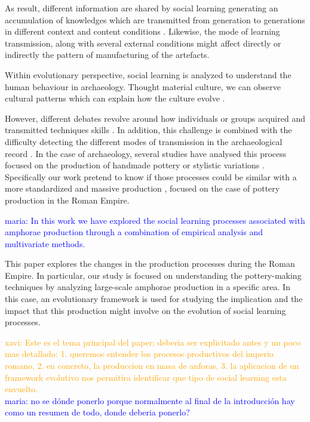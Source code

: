 \documentclass[review]{elsarticle}
\newcommand{\memo}[2]{\textcolor{#1}{#2}}
\newcommand{\xavi}[1]{\memo{orange}{xavi: #1\\}}
\newcommand{\maria}[1]{\memo{blue}{maria: #1\\}}
\begin{document}

As result, different information are shared by social learning generating an accumulation of knowledges which are transmitted from generation to generations in different context and content conditions  \citep{eerkens_jelmer_cultural_2005, neff1992ceramics,henrich_evolution_2003, boyd_cultural_2011}. Likewise, the mode of learning transmission, along with several external conditions might affect directly or indirectly the pattern of manufacturing of the artefacts.

Within evolutionary perspective, social learning is analyzed to understand the human behaviour in archaeology. Thought material culture, we can observe cultural patterns which can explain how the culture evolve \citep{richerson2005not}.


However, different debates revolve around how individuals or groups acquired and transmitted techniques skills  \citep{bowser_learning_2008, mesoudi_cultural_2008}. In addition, this challenge is combined with the difficulty detecting the different modes of transmission in the archaeological record \citep{roux_standardization_2015}. In the case of archaeology, several studies have analysed this process focused on the production of handmade pottery \citep{steele_james_ceramic_2010} or stylistic variations \citep{neiman_stylistic_1995, shennan_ceramic_2001}. Specifically our work pretend to know if those processes could be similar with a more standardized and massive production \citep{gandon_copying_2014}, focused on the case of pottery production in the Roman Empire. 

 
\maria {In this work we have explored the social learning processes associated with amphorae production through a combination of empirical analysis and multivariate methods.}  
                     
This paper explores the changes in the production processes during the Roman Empire. In particular, our study is focused on understanding the pottery-making techniques by analyzing large-scale amphorae production in a specific  area. In this case, an evolutionary framework is used for studying the implication and the impact that this production might involve on the  evolution of social learning processes.  


\xavi{Este es el tema principal del paper; deberia ser explicitado antes y un poco mas detallado: 1. queremos entender los procesos productivos del imperio romano, 2. en concreto, la produccion en masa de anforas, 3. la aplicacion de un framework evolutivo nos permitira identificar que tipo de social learning esta envuelto.}
\maria{no se dónde ponerlo porque normalmente al final de la introducción hay como un resumen de todo, donde deberia ponerlo?}
 
\end{document}
